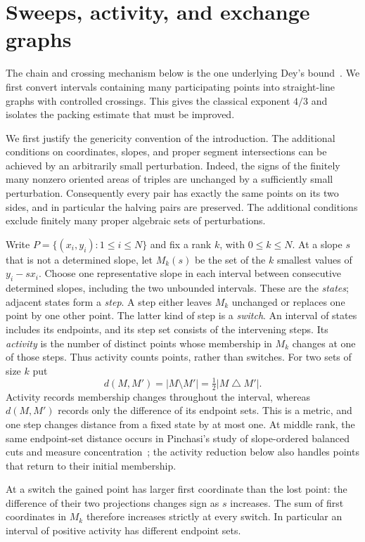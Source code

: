 \section{Sweeps, activity, and exchange graphs}
\label{sec:finite}

The chain and crossing mechanism below is the one underlying Dey's bound~\cite{Dey1998}. We first convert intervals containing many participating points into
straight-line graphs with controlled crossings.  This gives the classical
exponent $4/3$ and isolates the packing estimate that must be improved.

We first justify the genericity convention of the introduction. The
additional conditions on coordinates, slopes, and proper segment
intersections can be achieved by an arbitrarily small perturbation.  Indeed, the signs
of the finitely many nonzero oriented areas of triples are unchanged by
a sufficiently small perturbation.  Consequently every pair has exactly
the same points on its two sides, and in particular the halving pairs are
preserved.  The additional conditions exclude finitely many proper
algebraic sets of perturbations.

Write $P=\{(x_i,y_i):1\le i\le N\}$ and fix a rank $k$, with
$0\le k\le N$.  At a slope $s$ that is not a determined slope, let
$M_k(s)$ be the set of the $k$ smallest values of $y_i-sx_i$.
Choose one representative slope in each interval between consecutive
determined slopes, including the two unbounded intervals.  These are
the \emph{states}; adjacent states form a \emph{step}.  A step either
leaves $M_k$ unchanged or replaces one point by one other point.
The latter kind of step is a \emph{switch}.  An interval of states
includes its endpoints, and its step set consists of the intervening
steps.  Its \emph{activity} is the number of distinct points whose
membership in $M_k$ changes at one of those steps.  Thus activity counts
points, rather than switches.  For two sets of size $k$ put
\[
 d(M,M')=|M\setminus M'|=\tfrac12|M\mathbin{\triangle}M'|.
\]
Activity records membership changes throughout the interval, whereas
$d(M,M')$ records only the difference of its endpoint sets.
This is a metric, and one step changes distance from a fixed state by
at most one. At middle rank, the same endpoint-set distance occurs
in Pinchasi's study of slope-ordered balanced cuts and measure
concentration~\cite{Pinchasi2009}; the activity reduction below also
handles points that return to their initial membership.

At a switch the gained point has larger first coordinate than the lost
point: the difference of their two projections changes sign as $s$
increases.  The sum of first coordinates in $M_k$ therefore increases
strictly at every switch.  In particular an interval of positive
activity has different endpoint sets.

